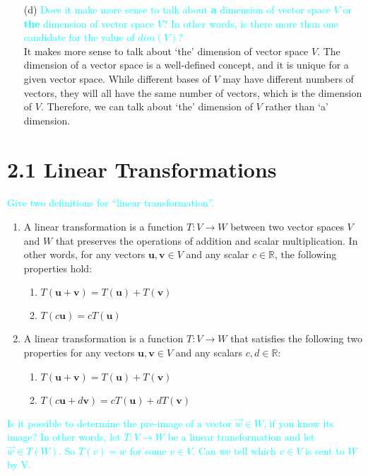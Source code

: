 \documentclass[fontsize=12pt]{scrartcl}
\begin{document}
\begin{itemize}
    \item[(d)] \textcolor{cyan}{Does it make more sense to talk about \textbf{a} dimension of vector space $V$ or \textbf{the} dimension of vector space $V$? In other words, is there more than one candidate for the value of $dim(V)$?}
    \\ It makes more sense to talk about `the' dimension of vector space $V$. The dimension of a vector space is a well-defined concept, and it is unique for a given vector space. While different bases of $V$ may have different numbers of vectors, they will all have the same number of vectors, which is the dimension of $V$. Therefore, we can talk about `the' dimension of $V$ rather than `a' dimension.
    \end{itemize}
    
\newpage

\section{2.1 Linear Transformations}

\textcolor{cyan}{Give two definitions for ``linear transformation''.}

\begin{enumerate}
	\item A linear transformation is a function $T: V \rightarrow W$ between two vector spaces $V$ and $W$ that preserves the operations of addition and scalar multiplication. In other words, for any vectors $\mathbf{u}, \mathbf{v} \in V$ and any scalar $c \in \mathbb{R}$, the following properties hold:
\begin{enumerate}
	\item $T(\mathbf{u}+\mathbf{v}) = T(\mathbf{u}) + T(\mathbf{v})$
	\item $T(c\mathbf{u}) = cT(\mathbf{u})$
\end{enumerate}
	\item A linear transformation is a function $T: V \rightarrow W$ that satisfies the following two properties for any vectors $\mathbf{u}, \mathbf{v} \in V$ and any scalars $c, d \in \mathbb{R}$:
\begin{enumerate}
	\item $T(\mathbf{u}+\mathbf{v}) = T(\mathbf{u}) + T(\mathbf{v})$
	\item $T(c\mathbf{u}+d\mathbf{v}) = cT(\mathbf{u}) + dT(\mathbf{v})$
\end{enumerate}
\end{enumerate}

\noindent
\textcolor{cyan}{Is it possible to determine the pre-image of a vector $\vec{w} \in W$, if you know its image? In other words, let $T: V \to W$ be a linear transformation and let $\vec{w} \in T(W)$. So $T(v) = w$ for some $v \in V$. Can we tell which $v \in V$ is sent to $W$ by V.}
\end{document}
